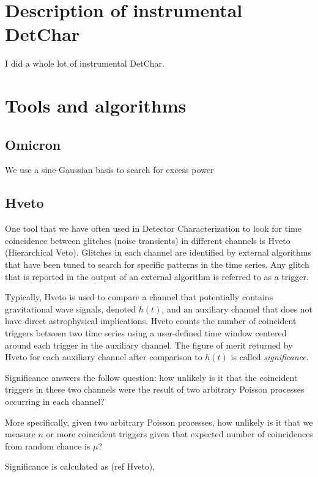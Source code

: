 \section{Description of instrumental DetChar}

I did a whole lot of instrumental DetChar.

\section{Tools and algorithms}

\subsection{Omicron}

We use a sine-Gaussian basis to search for excess power

\subsection{Hveto}

One tool that we have often used in Detector Characterization to look 
for time coincidence between glitches (noise transients) in different 
channels is Hveto (Hierarchical Veto). Glitches in each channel are 
identified by external algorithms that have been tuned to search for 
specific patterns in the time series. Any glitch that is reported in 
the output of an external algorithm is referred to as a trigger. 

Typically, Hveto is used to compare a channel that potentially contains 
gravitational wave signals, denoted $h(t)$, and an auxiliary channel 
that does not have direct astrophysical implications. Hveto counts 
the number of coincident triggers between two time series using a 
user-defined time window centered around each trigger in the auxiliary 
channel. The figure of merit returned by Hveto for each auxiliary channel 
after comparison to $h(t)$ is called \textit{significance}.

Significance answers the follow question: how unlikely is it that 
the coincident triggers in these two channels were the result of 
two arbitrary Poisson processes occurring in each channel? 

More specifically, given two arbitrary Poisson processes, how 
unlikely is it that we measure $n$ or more coincident triggers 
given that expected number of coincidences from random chance is $\mu$?

Significance is calculated as (ref Hveto),

